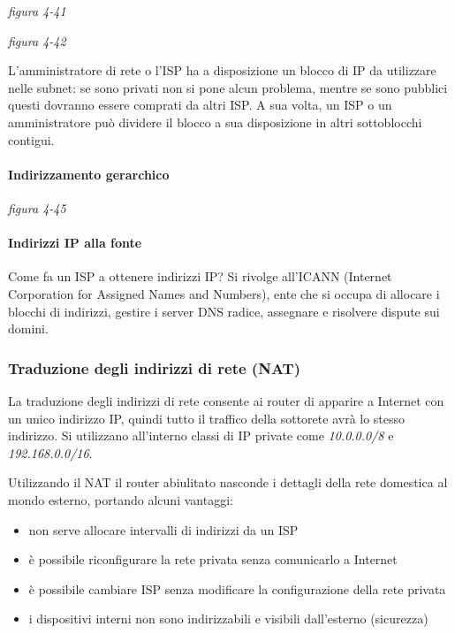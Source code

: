 \documentclass[
]{article}
\begin{document}
\emph{figura 4-41}

\emph{figura 4-42}

L'amministratore di rete o l'ISP ha a disposizione un blocco di IP da
utilizzare nelle subnet: se sono privati non si pone alcun problema,
mentre se sono pubblici questi dovranno essere comprati da altri ISP. A
sua volta, un ISP o un amministratore può dividere il blocco a sua
disposizione in altri sottoblocchi contigui.

\hypertarget{header-n115}{%
\paragraph{Indirizzamento gerarchico}\label{header-n115}}

\emph{figura 4-45}

\hypertarget{header-n117}{%
\paragraph{Indirizzi IP alla fonte}\label{header-n117}}

Come fa un ISP a ottenere indirizzi IP? Si rivolge all'ICANN (Internet
Corporation for Assigned Names and Numbers), ente che si occupa di
allocare i blocchi di indirizzi, gestire i server DNS radice, assegnare
e risolvere dispute sui domini.

\hypertarget{header-n119}{%
\subsubsection{Traduzione degli indirizzi di rete
(NAT)}\label{header-n119}}

La traduzione degli indirizzi di rete consente ai router di apparire a
Internet con un unico indirizzo IP, quindi tutto il traffico della
sottorete avrà lo stesso indirizzo. Si utilizzano all'interno classi di
IP private come \emph{10.0.0.0/8} e \emph{192.168.0.0/16}.

Utilizzando il NAT il router abiulitato nasconde i dettagli della rete
domestica al mondo esterno, portando alcuni vantaggi:

\begin{itemize}
\item
  non serve allocare intervalli di indirizzi da un ISP
\item
  è possibile riconfigurare la rete privata senza comunicarlo a Internet
\item
  è possibile cambiare ISP senza modificare la configurazione della rete
  privata
\item
  i dispositivi interni non sono indirizzabili e visibili dall'esterno
  (sicurezza)
\end{itemize}
\end{document}

